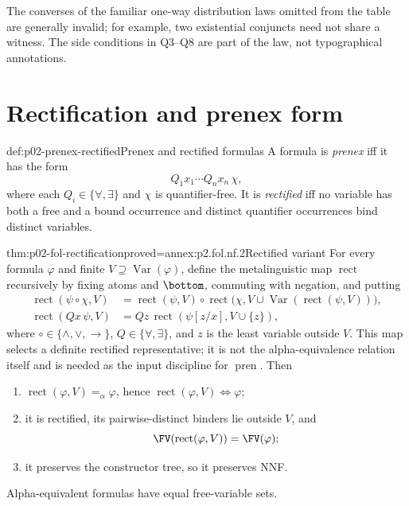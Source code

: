 The converses of the familiar one-way distribution laws omitted from the
table are generally invalid; for example, two existential conjuncts need not
share a witness.  The side conditions in Q3--Q8 are part of the law, not
typographical annotations.

\section{Rectification and prenex form}
\label{sec:p02-fol-prenex}

\begin{hbdefinition}{def:p02-prenex-rectified}{Prenex and rectified formulas}
A formula is \emph{prenex} iff it has the form
\[
 Q_1x_1\cdots Q_nx_n\,\chi,
\]
where each \(Q_i\in\{\forall,\exists\}\) and \(\chi\) is
quantifier-free.  It is \emph{rectified} iff no
variable has both a free and a bound occurrence and distinct quantifier
occurrences bind distinct variables.
\end{hbdefinition}

\begin{hblemma}{thm:p02-fol-rectification}{proved=annex:p2.fol.nf.2}{Rectified variant}
For every formula \(\varphi\) and finite
\(V\supseteq\operatorname{Var}(\varphi)\), define the metalinguistic map
\(\operatorname{rect}\) recursively by fixing atoms and \(\bottom\), commuting
with negation, and putting
\[
\begin{aligned}
 \operatorname{rect}(\psi\mathbin\circ\chi,V)
   &=\operatorname{rect}(\psi,V)\mathbin\circ
     \operatorname{rect}\bigl(\chi,
       V\cup\operatorname{Var}(\operatorname{rect}(\psi,V))\bigr),\\
 \operatorname{rect}(Qx\,\psi,V)
   &=Qz\,\operatorname{rect}(\psi[z/x],V\cup\{z\}),
\end{aligned}
\]
where \(\circ\in\{\land,\lor,\to\}\), \(Q\in\{\forall,\exists\}\), and
\(z\) is the least variable outside \(V\).  This map selects a definite
rectified representative; it is not the alpha-equivalence relation itself and
is needed as the input discipline for \(\operatorname{pren}\).  Then
\begin{enumerate}
  \item \(\operatorname{rect}(\varphi,V)=_{\alpha}\varphi\), hence
        \(\operatorname{rect}(\varphi,V)\Leftrightarrow\varphi\);
  \item it is rectified, its pairwise-distinct binders lie outside \(V\), and
        \[
         \FV(\operatorname{rect}(\varphi,V))=\FV(\varphi);
        \]
  \item it preserves the constructor tree, so it preserves NNF.
\end{enumerate}
Alpha-equivalent formulas have equal free-variable sets.
\end{hblemma}

